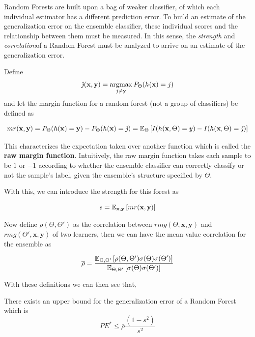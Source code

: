 Random Forests are built upon a bag of weaker classifier, of which each individual estimator has a different prediction error.
To build an estimate of the generalization error on the ensemble classifier, these individual scores and the relationship between them must be measured.
In this sense, the \textit{strength} and \textit{correlation}of a Random Forest must be analyzed to arrive on an estimate of the generalization error.


Define $$\hat{\jmath}( \textbf{x},\textbf{y}) = \operatorname*{argmax}_{j \neq \textbf{y}} P_{\Theta}(h(\textbf{x}) = j)$$ and let the margin function for a random forest (not a group of classifiers) be defined as

\[
mr(\textbf{x},\textbf{y}) = P_{\Theta}(h(\textbf{x}) = \textbf{y}) - P_{\Theta}(h(\textbf{x}) = \hat{\jmath})
\\
= \operatorname{\mathbb{E}}_{\Theta} \left[ I(h(\textbf{x},\Theta ) = y ) - I( h( \textbf{x},\Theta ) = \hat{\jmath} ) \right]
\]

This characterizes the expectation taken over another function which is called the \textbf{raw margin function}.
Intuitively, the raw margin function takes each sample to be $1$ or $-1$ according to whether the ensemble classifier can correctly classify or not the sample's label, given the ensemble's structure specified by $\Theta$.

With this, we can introduce the strength for this forest as

\begin{equation}
s = \operatorname{\mathbb{E}}_{\textbf{x},\textbf{y}} \left[ mr(\textbf{x},\textbf{y} ) \right]
\end{equation}

Now define $ \rho(\Theta, \Theta')$ as the correlation between $rmg(\Theta,\textbf{x},\textbf{y})$ and $rmg(\Theta',\textbf{x},\textbf{y})$ of two learners, then we can have the mean value correlation for the ensemble as 

\begin{equation}
\overline{\rho} = \frac{\operatorname{\mathbb{E}}_{\Theta, \Theta'} \left[ \rho(\Theta, \Theta') \sigma(\Theta) \sigma(\Theta')\right]}
{\operatorname{\mathbb{E}}_{\Theta, \Theta'} \left[ \sigma(\Theta) \sigma(\Theta')\right]}
\end{equation}

With these definitions we can then see that,

\begin{theorem}
There exists an upper bound for the generalization error of a Random Forest which is    \begin{equation}
PE^* \leq \overline{\rho}\frac{(1-s^2)}{s^2}
\end{equation}
\end{theorem}

